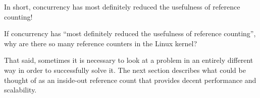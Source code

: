 In short, concurrency has most definitely reduced the usefulness
of reference counting!

\QuickQuiz{}
	If concurrency has ``most definitely reduced the usefulness
	of reference counting'', why are there so many reference
	counters in the Linux kernel?
 \QuickQuizEnd

That said, sometimes it is necessary to look at a problem in an
entirely different way in order to successfully solve it.
The next section describes what could be thought of as an
inside-out reference count that provides decent performance
and scalability.
